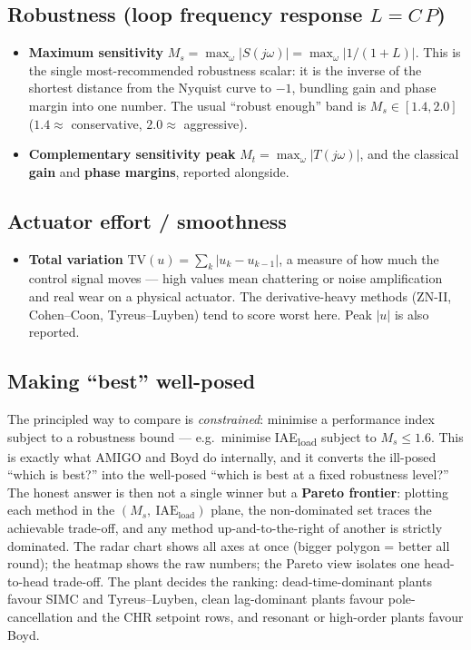 \documentclass[11pt]{article}
\begin{document}
\subsection*{Robustness (loop frequency response $L = C\,P$)}
\begin{itemize}[leftmargin=1.4em,itemsep=0.15em]
  \item \textbf{Maximum sensitivity} $M_s=\max_\omega |S(j\omega)|
        = \max_\omega \bigl|1/(1+L)\bigr|$. This is the single most-recommended
        robustness scalar: it is the inverse of the shortest distance from the
        Nyquist curve to $-1$, bundling gain and phase margin into one number.
        The usual ``robust enough'' band is $M_s\in[1.4, 2.0]$ ($1.4 \approx$
        conservative, $2.0 \approx$ aggressive).
  \item \textbf{Complementary sensitivity peak} $M_t=\max_\omega|T(j\omega)|$,
        and the classical \textbf{gain} and \textbf{phase margins}, reported
        alongside.
\end{itemize}

\subsection*{Actuator effort / smoothness}
\begin{itemize}[leftmargin=1.4em,itemsep=0.15em]
  \item \textbf{Total variation} $\mathrm{TV}(u)=\sum_k |u_{k}-u_{k-1}|$, a
        measure of how much the control signal moves --- high values mean
        chattering or noise amplification and real wear on a physical
        actuator. The derivative-heavy methods (ZN-II, Cohen--Coon,
        Tyreus--Luyben) tend to score worst here. Peak $|u|$ is also reported.
\end{itemize}

\subsection*{Making ``best'' well-posed}
The principled way to compare is \emph{constrained}: minimise a performance
index subject to a robustness bound --- e.g.\ minimise IAE\textsubscript{load}
subject to $M_s \le 1.6$. This is exactly what AMIGO and Boyd do internally,
and it converts the ill-posed ``which is best?'' into the well-posed ``which is
best at a fixed robustness level?'' The honest answer is then not a single
winner but a \textbf{Pareto frontier}: plotting each method in the
$(M_s,\ \text{IAE}_{\text{load}})$ plane, the non-dominated set traces the
achievable trade-off, and any method up-and-to-the-right of another is strictly
dominated. The radar chart shows all axes at once (bigger polygon = better all
round); the heatmap shows the raw numbers; the Pareto view isolates one
head-to-head trade-off. The plant decides the ranking: dead-time-dominant
plants favour SIMC and Tyreus--Luyben, clean lag-dominant plants favour
pole-cancellation and the CHR setpoint rows, and resonant or high-order plants
favour Boyd.
\end{document}

